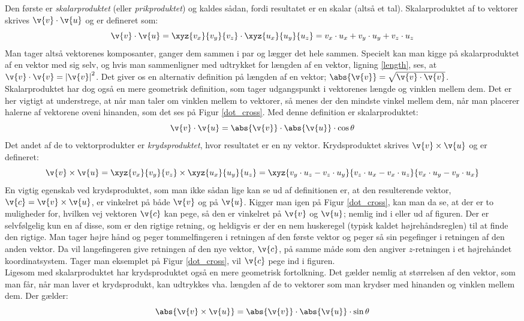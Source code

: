 Den første er \emph{skalarproduktet} (eller \emph{prikproduktet}) og kaldes sådan, fordi resultatet er en skalar (altså et tal). Skalarproduktet af to vektorer skrives $\v{v} \cdot \v{u}$ og er defineret som:
\begin{equation}
\v{v} \cdot \v{u} = \xyz{v_x}{v_y}{v_z} \cdot \xyz{u_x}{u_y}{u_z}
= v_x \cdot u_x + v_y \cdot u_y + v_z \cdot u_z
\end{equation} 
Man tager altså vektorenes komposanter, ganger dem sammen i par og lægger det hele sammen. Specielt kan man kigge på skalarproduktet af en vektor med sig selv, og hvis man sammenligner med udtrykket for længden af en vektor, ligning \eqref{length}, ses, at $\v{v} \cdot \v{v} = \left| \v{v} \right|^2$. Det giver os en alternativ definition på længden af en vektor; $\abs{\v{v}} = \sqrt{\v{v} \cdot \v{v}}$.\\ 
Skalarproduktet har dog også en mere geometrisk definition, som tager udgangspunkt i vektorenes længde og vinklen mellem dem. Det er her vigtigt at understrege, at når man taler om vinklen mellem to vektorer, så menes der den mindste vinkel mellem dem, når man placerer halerne af vektorene oveni hinanden, som det ses på Figur \ref{dot_cross}. Med denne definition er skalarproduktet:
\begin{equation}
\v{v} \cdot \v{u} = \abs{\v{v}} \cdot \abs{\v{u}} \cdot \cos \theta
\end{equation} 
Det andet af de to vektorprodukter er \emph{krydsproduktet}, hvor resultatet er en ny vektor. Krydsproduktet skrives $\v{v} \times \v{u}$ og er defineret:
\begin{equation}
\v{v} \times \v{u} = \xyz{v_x}{v_y}{v_z} \times \xyz{u_x}{u_y}{u_z} = \xyz{v_y \cdot u_z - v_z \cdot u_y}{v_z \cdot u_x - v_x \cdot u_z}{v_x \cdot u_y - v_y \cdot u_x}
\end{equation} 
En vigtig egenskab ved krydsproduktet, som man ikke sådan lige kan se ud af definitionen er, at den resulterende vektor, $\v{c} = \v{v} \times \v{u}$, er vinkelret på både $\v{v}$ og på $\v{u}$. Kigger man igen på Figur \ref{dot_cross}, kan man da se, at der er to muligheder for, hvilken vej vektoren $\v{c}$ kan pege, så den er vinkelret på $\v{v}$ og $\v{u}$; nemlig ind i eller ud af figuren. Der er selvfølgelig kun en af disse, som er den rigtige retning, og heldigvis er der en nem huskeregel (typisk kaldet højrehåndsreglen) til at finde den rigtige. Man tager højre hånd og peger tommelfingeren i retningen af den første vektor og peger så sin pegefinger i retningen af den anden vektor. Da vil langefingeren give retningen af den nye vektor, $\v{c}$, på samme måde som den angiver $z$-retningen i et højrehåndet koordinatsystem. Tager man eksemplet på Figur \ref{dot_cross}, vil $\v{c}$ pege ind i figuren.\\
Ligesom med skalarproduktet har krydsproduktet også en mere geometrisk fortolkning. Det gælder nemlig at størrelsen af den vektor, som man får, når man laver et krydsprodukt, kan udtrykkes vha. længden af de to vektorer som man krydser med hinanden og vinklen mellem dem. Der gælder:
\begin{equation}
\abs{\v{v} \times \v{u}} = \abs{\v{v}} \cdot \abs{\v{u}} \cdot \sin \theta 
\end{equation}

